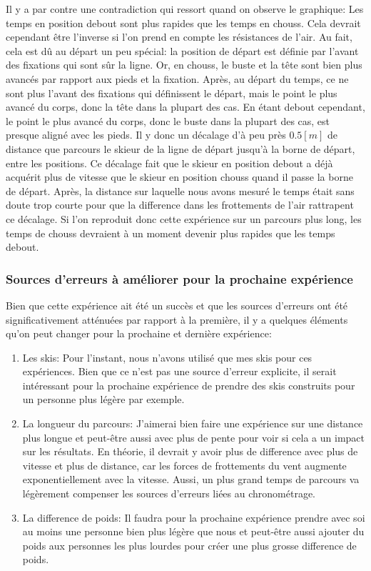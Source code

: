 \documentclass{article}
\begin{document}
Il y a par contre une contradiction qui ressort quand on observe le graphique: Les temps en position debout sont plus rapides que les temps en chouss. Cela devrait cependant être l'inverse si l'on prend en compte les résistances de l'air. Au fait, cela est dû au départ un peu spécial: la position de départ est définie par l'avant des fixations qui sont sûr la ligne. Or, en chouss, le buste et la tête sont bien plus avancés par rapport aux pieds et la fixation. Après, au départ du temps, ce ne sont plus l'avant des fixations qui définissent le départ, mais le point le plus avancé du corps, donc la tête dans la plupart des cas. En étant debout cependant, le point le plus avancé du corps, donc le buste dans la plupart des cas, est presque aligné avec les pieds. Il y donc un décalage d'à peu près $0.5[m]$ de distance que parcours le skieur de la ligne de départ jusqu'à la borne de départ, entre les positions. Ce décalage fait que le skieur en position debout a déjà acquérit plus de vitesse que le skieur en position chouss quand il passe la borne de départ. Après, la distance sur laquelle nous avons mesuré le temps était sans doute trop courte pour que la difference dans les frottements de l'air rattrapent ce décalage. Si l'on reproduit donc cette expérience sur un parcours plus long, les temps de chouss devraient à un moment devenir plus rapides que les temps debout. 

\subsubsection{Sources d'erreurs à améliorer pour la prochaine expérience}

Bien que cette expérience ait été un succès et que les sources d'erreurs ont été significativement atténuées par rapport à la première, il y a quelques éléments qu'on peut changer pour la prochaine et dernière expérience:
\begin{enumerate}
    \item Les skis: Pour l'instant, nous n'avons utilisé que mes skis pour ces expériences. Bien que ce n'est pas une source d'erreur explicite, il serait intéressant pour la prochaine expérience de prendre des skis construits pour un personne plus légère par exemple.

    \item La longueur du parcours: J'aimerai bien faire une expérience sur une distance plus longue et peut-être aussi avec plus de pente pour voir si cela a un impact sur les résultats. En théorie, il devrait y avoir plus de difference avec plus de vitesse et plus de distance, car les forces de frottements du vent augmente exponentiellement avec la vitesse. Aussi, un plus grand temps de parcours va légèrement compenser les sources d'erreurs liées au chronométrage.

    \item La difference de poids: Il faudra pour la prochaine expérience prendre avec soi au moins une personne bien plus légère que nous et peut-être aussi ajouter du poids aux personnes les plus lourdes pour créer une plus grosse difference de poids.
\end{enumerate}
\end{document}
